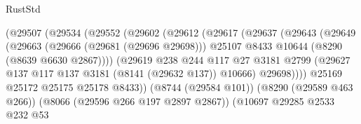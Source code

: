 \begin{lexlean}{RustStd}
\begin{coremodule}
                                      (@29507
                                        (@29534
                                          (@29552
                                            (@29602
                                              (@29612
                                                (@29617
                                                  (@29637
                                                    (@29643
                                                      (@29649
                                                        (@29663
                                                          (@29666 (@29681 (@29696 @29698)))
                                                          @25107
                                                          @8433
                                                          @10644
                                                          (@8290 (@8639 @6630 @2867))))
                                                      (@29619
                                                        @238
                                                        @244
                                                        @117
                                                        @27
                                                        @3181
                                                        @2799
                                                        (@29627
                                                          @137
                                                          @117
                                                          @137
                                                          @3181
                                                          (@8141 (@29632 @137))
                                                          @10666)
                                                        @29698))))
                                                @25169
                                                @25172
                                                @25175
                                                @25178
                                                @8433))
                                            (@8744 (@29584 @101))
                                            (@8290 (@29589 @463 @266))
                                            (@8066 (@29596 @266 @197 @2897 @2867))
                                            (@10697
                                              @29285
                                              @2533
                                              @232
                                              @53

\end{coremodule}
\end{lexlean}
